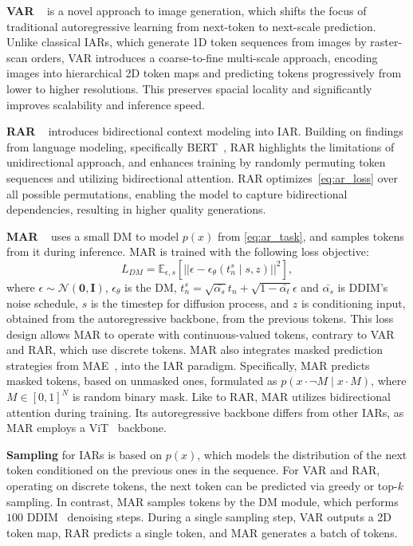 \textbf{VAR}
~\citep{var_tian2024visualautoregressivemodelingscalable} is a novel approach to image generation, which shifts the focus of traditional autoregressive learning from next-token to next-scale prediction. Unlike classical IARs, which generate 1D token sequences from images by raster-scan orders, VAR introduces a coarse-to-fine multi-scale approach, encoding images into hierarchical 2D token maps and predicting tokens progressively from lower to higher resolutions. This preserves spacial locality and significantly improves scalability and inference speed.






\textbf{RAR}
~\citep{rar_yu2024randomizedautoregressivevisualgeneration} introduces bidirectional context modeling into IAR. 
Building on findings from language modeling, specifically BERT~\citep{devlin2019bertpretrainingdeepbidirectional}, RAR highlights the limitations of unidirectional approach, and enhances training by randomly permuting token sequences and utilizing bidirectional attention. RAR optimizes~\cref{eq:ar_loss} over all possible permutations, enabling the model to capture bidirectional dependencies, resulting in higher quality generations. 

\textbf{MAR}
~\citep{mar_li2024autoregressiveimagegenerationvector}  uses a small DM to model $p(x)$ from \cref{eq:ar_task}, and samples tokens from it during inference. MAR is trained with the following loss objective:
\begin{equation}
    L_{DM}=\mathbb{E}_{\epsilon,s}\left[||\epsilon-\epsilon_{\theta}\left(t_n^s\mid s,z\right)||^2\right],
    \label{eq:dm_loss}
\end{equation}
where $\epsilon\sim\mathcal{N}(\mathbf{0}, \mathbf{I})$, $\epsilon_{\theta}$ is the DM, $t_n^s=\sqrt{\bar{\alpha_s}}t_n+\sqrt{1-\bar{\alpha_t}}\epsilon$ and $\bar{\alpha_s}$ is DDIM's~\citep{songdenoising} noise schedule, $s$ is the timestep for diffusion process, and $z$ is conditioning input, obtained from the autoregressive backbone, from the previous tokens. This loss design allows MAR to operate with continuous-valued tokens, contrary to VAR and RAR, which use discrete tokens. 
MAR also integrates masked prediction strategies from MAE~\citep{he2022masked}, into the IAR paradigm. Specifically, MAR predicts masked tokens, based on unmasked ones, formulated as $p(x\cdot\neg M \mid x\cdot M)$, where $M\in[0,1]^{N}$ is random binary mask. Like to RAR, MAR utilizes bidirectional attention during training. Its autoregressive backbone differs from other IARs, as MAR employs a ViT~\citep{dosovitskiy2021imageworth16x16words} backbone.

\textbf{Sampling} for IARs is based on $p(x)$, which models the distribution of the next token conditioned on the previous ones in the sequence. 
For VAR and RAR, operating on discrete tokens, the next token can be predicted via greedy or top-$k$ sampling. 
In contrast, MAR samples tokens by the DM module, which performs $100$ DDIM~\citep{songdenoising} denoising steps. During a single sampling step, VAR outputs a 2D token map, RAR predicts a single token, and MAR generates a batch of tokens.


